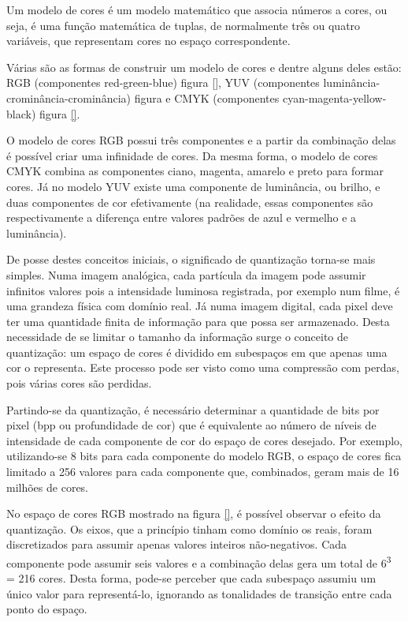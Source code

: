 Um modelo de cores é um modelo matemático que associa números a cores, ou seja, é uma função matemática de tuplas, de normalmente três ou quatro variáveis, que representam cores no espaço correspondente.

Várias são as formas de construir um modelo de cores e dentre alguns deles estão: RGB (componentes red-green-blue) figura \ref{}, YUV (componentes luminância-crominância-crominância) figura e CMYK (componentes cyan-magenta-yellow-black) figura \ref{}. %


O modelo de cores RGB possui três componentes e a partir da combinação delas é possível criar uma infinidade de cores. Da mesma forma, o modelo de cores CMYK combina as componentes ciano, magenta, amarelo e preto para formar cores. Já no modelo YUV existe uma componente de luminância, ou brilho, e duas componentes de cor efetivamente (na realidade, essas componentes são respectivamente a diferença entre valores padrões de azul e vermelho e a luminância).

De posse destes conceitos iniciais, o significado de quantização torna-se mais simples. Numa imagem analógica, cada partícula da imagem pode assumir infinitos valores pois a intensidade luminosa registrada, por exemplo num filme, é uma grandeza física com domínio real. Já numa imagem digital, cada pixel deve ter uma quantidade finita de informação para que possa ser armazenado. Desta necessidade de se limitar o tamanho da informação surge o conceito de quantização: um espaço de cores é dividido em subespaços em que apenas uma cor o representa. Este processo pode ser visto como uma compressão com perdas, pois várias cores são perdidas.

Partindo-se da quantização, é necessário determinar a quantidade de bits por pixel (bpp ou profundidade de cor) que é equivalente ao número de níveis de intensidade de cada componente de cor do espaço de cores desejado. Por exemplo, utilizando-se 8 bits para cada componente do modelo RGB, o espaço de cores fica limitado a 256 valores para cada componente que, combinados, geram mais de 16 milhões de cores.

No espaço de cores RGB mostrado na figura \ref{}, é possível observar o efeito da quantização. %
Os eixos, que a princípio tinham como domínio os reais, foram discretizados para assumir apenas valores inteiros não-negativos. Cada componente pode assumir seis valores e a combinação delas gera um total de 6\textsuperscript{3} = 216 cores. Desta forma, pode-se perceber que cada subespaço assumiu um único valor para representá-lo, ignorando as tonalidades de transição entre cada ponto do espaço.

